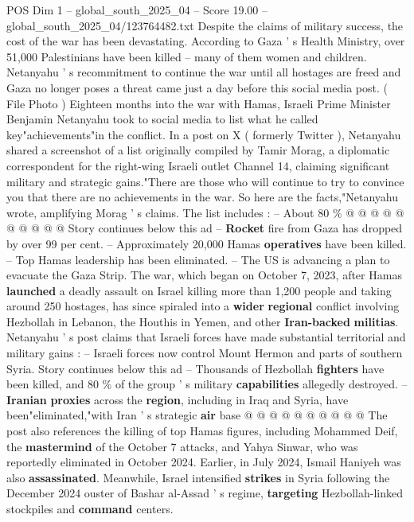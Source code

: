 \begin{textsample}{POS Dim 1 – global\_south\_2025\_04 – Score 19.00 – global\_south\_2025\_04/123764482.txt}  \label{ex:f1_pos_321}
Despite the claims of military success, the cost of the war has been devastating.
According to Gaza ' s Health Ministry, over 51,000 Palestinians have been killed -- many of them women and children.
Netanyahu ' s recommitment to continue the war until all hostages are freed and Gaza no longer poses a threat came just a day before this social media post. ( File Photo ) Eighteen months into the war with Hamas, Israeli Prime Minister Benjamin Netanyahu took to social media to list what he called key"achievements"in the conflict.
In a post on X ( formerly Twitter ), Netanyahu shared a screenshot of a list originally compiled by Tamir Morag, a diplomatic correspondent for the right-wing Israeli outlet Channel 14, claiming significant military and strategic gains."There are those who will continue to try to convince you that there are no achievements in the war.
So here are the facts,"Netanyahu wrote, amplifying Morag ' s claims.
The list includes : -- About 80 \% @ @ @ @ @ @ @ @ @ @ Story continues below this ad -- \textbf{Rocket} fire from Gaza has dropped by over 99 per cent. -- Approximately 20,000 Hamas \textbf{operatives} have been killed. -- Top Hamas leadership has been eliminated. -- The US is advancing a plan to evacuate the Gaza Strip.
The war, which began on October 7, 2023, after Hamas \textbf{launched} a deadly assault on Israel killing more than 1,200 people and taking around 250 hostages, has since spiraled into a \textbf{wider} \textbf{regional} conflict involving Hezbollah in Lebanon, the Houthis in Yemen, and other \textbf{Iran-backed} \textbf{militias}.
Netanyahu ' s post claims that Israeli forces have made substantial territorial and military gains : -- Israeli forces now control Mount Hermon and parts of southern Syria.
Story continues below this ad -- Thousands of Hezbollah \textbf{fighters} have been killed, and 80 \% of the group ' s military \textbf{capabilities} allegedly destroyed. -- \textbf{Iranian} \textbf{proxies} across the \textbf{region}, including in Iraq and Syria, have been"eliminated,"with Iran ' s strategic \textbf{air} base @ @ @ @ @ @ @ @ @ @ The post also references the killing of top Hamas figures, including Mohammed Deif, the \textbf{mastermind} of the October 7 attacks, and Yahya Sinwar, who was reportedly eliminated in October 2024.
Earlier, in July 2024, Ismail Haniyeh was also \textbf{assassinated}.
Meanwhile, Israel intensified \textbf{strikes} in Syria following the December 2024 ouster of Bashar al-Assad ' s regime, \textbf{targeting} Hezbollah-linked stockpiles and \textbf{command} centers.

\end{textsample}

